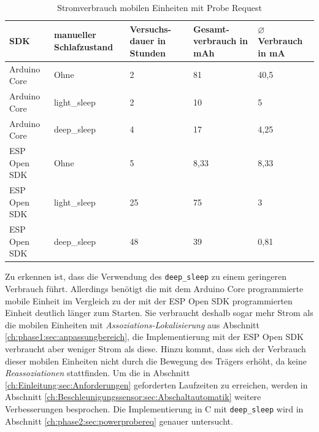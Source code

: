 \begin{table}[h]
	\centering
	\caption{Stromverbrauch mobilen Einheiten mit Probe Request}
	\label{table:probeconsumption}
	\begin{tabular}{l|p{2.5cm}|p{2cm}|p{2cm}|p{2.5cm}}
		SDK & manueller Schlafzustand  & Versuchs-dauer in Stunden & Gesamt-verbrauch in mAh & $\varnothing$ Verbrauch in mA \\
		\hline
		Arduino Core & Ohne & 2 & 81 & 40,5 \\
		Arduino Core & light\_sleep & 2 & 10 & 5 \\
		Arduino Core & deep\_sleep & 4 & 17 & 4,25 \\
		ESP Open SDK & Ohne & 5 & 8,33 & 8,33 \\
		ESP Open SDK & light\_sleep & 25 & 75 & 3 \\
		ESP Open SDK & deep\_sleep & 48 & 39 & 0,81 \\
	\end{tabular}
\end{table}


Zu erkennen ist, dass die Verwendung des \texttt{deep\_sleep} zu einem geringeren Verbrauch führt. 
Allerdings benötigt die mit dem Arduino Core programmierte mobile Einheit im Vergleich zu der mit der ESP Open SDK programmierten Einheit deutlich länger zum Starten.
Sie verbraucht deshalb sogar mehr Strom als die mobilen Einheiten mit \emph{Assoziations-Lokalisierung} aus Abschnitt \ref{ch:phase1:sec:anpassungbereich}, die Implementierung mit der ESP Open SDK verbraucht aber weniger Strom als diese.
Hinzu kommt, dass sich der Verbrauch dieser mobilen Einheiten nicht durch die Bewegung des Trägers erhöht, da keine \emph{Reassoziationen} stattfinden.
Um die in Abschnitt \ref{ch:Einleitung:sec:Anforderungen} geforderten Laufzeiten zu erreichen, werden in Abschnitt \ref{ch:Beschleunigungssensor:sec:Abschaltautomatik} weitere Verbesserungen besprochen.
Die Implementierung in C mit \texttt{deep\_sleep} wird in Abschnitt \ref{ch:phase2:sec:powerprobereq} genauer untersucht.

